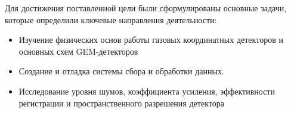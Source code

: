 Для достижения поставленной цели были сформулированы основные задачи, которые определили ключевые направления деятельности:
\begin{itemize}
    
    \item Изучение физических основ работы газовых координатных детекторов и основных схем GEM-детекторов
    \item Создание и отладка системы сбора и обработки данных.
    \item Исследование уровня шумов, коэффициента усиления, эффективности регистрации и пространственного разрешения детектора 
	
\end{itemize}